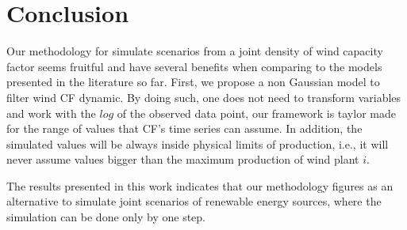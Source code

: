 \documentclass[a4paper]{IEEEtran}
\begin{document}

\section{Conclusion}\label{Conclusion}

Our methodology for simulate scenarios from a joint density of wind capacity factor seems fruitful and have several benefits when comparing to the models presented in the  literature so far. First, we propose a non Gaussian model to filter wind CF dynamic. By doing such, one does not need to transform variables and work with the $log$ of the observed data point, our framework is taylor made for the range of values that CF's time series can assume. In addition, the simulated values will be always inside physical limits of production, i.e., it will never assume values bigger than the maximum production of wind plant $i$.

The results presented in this work indicates that our methodology figures as an alternative to simulate joint scenarios of renewable energy sources, where the simulation can be done only by one step.









\end{document}
